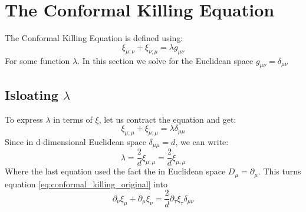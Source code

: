 \documentclass{article}
\begin{document}
\section{The Conformal Killing Equation}
The Conformal Killing Equation is defined using:
\begin{equation}
\label{eq:conformal_killing_original}
    \xi_{\mu;\nu} + \xi_{\nu;\mu} = \lambda g_{\mu\nu}
\end{equation}
For some function $\lambda$. In this section we solve for the Euclidean space $g_{\mu\nu} = \delta_{\mu\nu}$
\subsection{Isloating $\lambda$}
To express $\lambda$ in terms of $\xi$, let us contract the equation and get:
\begin{equation}
    \xi_{\mu;\mu} + \xi_{\mu;\mu} = \lambda \delta_{\mu\mu}
\end{equation}
Since in d-dimensional Euclidean space $\delta_{\mu\mu} = d$, we can write:
\begin{equation}
\label{eq:lambda}
    \lambda = \frac{2}{d}\xi_{\mu;\mu} = \frac{2}{d}\xi_{\mu,\mu}
\end{equation}
Where the last equation used the fact the in Euclidean space $D_\mu = \partial_\mu$. This turns equation \ref{eq:conformal_killing_original} into
\begin{equation}
\label{eq:conformal_killing_after_assignment}
    \partial_\nu \xi_{\mu} + \partial_\mu \xi_{\nu} = \frac{2}{d}\partial_\tau \xi_{\tau} \delta_{\mu\nu}
\end{equation}
\end{document}
